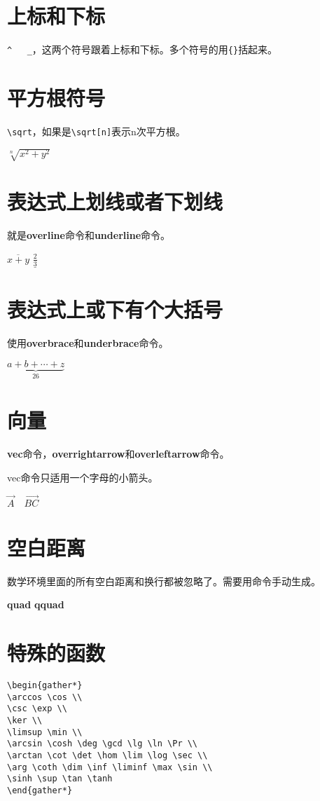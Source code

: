 \documentclass[12pt,oneside]{book}
\begin{document}
\begin{common-format}
\section{上标和下标}
\verb+^   _+，这两个符号跟着上标和下标。多个符号的用\verb+{}+括起来。

\section{平方根符号}
\verb+\sqrt+，如果是\verb+\sqrt[n]+表示n次平方根。

$\sqrt[n]{x^2+y^2}$

\section{表达式上划线或者下划线}
就是\textbf{overline}命令和\textbf{underline}命令。

$\overline{x+y}$  $\underline{\frac{2}{3}}$

\section{表达式上或下有个大括号}
使用\textbf{overbrace}和\textbf{underbrace}命令。

$\underbrace{ a+b+\cdots+z }_{26}$

\section{向量}
\textbf{vec}命令，\textbf{overrightarrow}和\textbf{overleftarrow}命令。

vec命令只适用一个字母的小箭头。

$\vec {A} \quad \overrightarrow{BC}$

\section{空白距离}
数学环境里面的所有空白距离和换行都被忽略了。需要用命令手动生成。

\textbf{quad}  \textbf{qquad}


\section{特殊的函数}
\begin{Verbatim}
\begin{gather*}
\arccos \cos \\
\csc \exp \\
\ker \\
\limsup \min \\ 
\arcsin \cosh \deg \gcd \lg \ln \Pr \\ 
\arctan \cot \det \hom \lim \log \sec \\
\arg \coth \dim \inf \liminf \max \sin \\
\sinh \sup \tan \tanh
\end{gather*}
\end{Verbatim}


\end{common-format}
\end{document}
